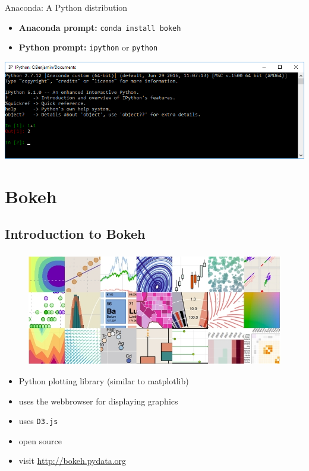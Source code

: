 \documentclass[11pt]{beamer}
\begin{document}
\begin{frame}
\frametitle{\insertsubsection}
\begin{block}{Anaconda: A Python distribution}
\begin{itemize}
\item \textbf{Anaconda prompt:} \texttt{conda install bokeh}
\item \textbf{Python prompt:} \texttt{ipython} or \texttt{python}
\end{itemize}
\end{block}
\includegraphics[width = \textwidth]{Pictures/PythonShell.png}
\end{frame}

\section{Bokeh}
\subsection{Introduction to Bokeh}
\begin{frame}
\frametitle{\insertsubsection}
\begin{figure}
\includegraphics[width=.8\textwidth]{Pictures/bokehGallery.jpg}
\end{figure}
\begin{itemize}
\item Python plotting library (similar to matplotlib)
\item uses the webbrowser for displaying graphics
\item uses \texttt{D3.js}
\item open source
\item visit \url{http://bokeh.pydata.org}
\end{itemize}
\end{frame}
\end{document}

